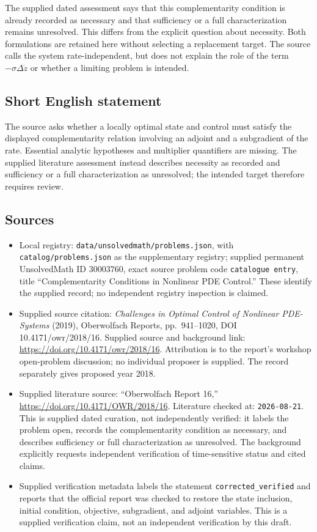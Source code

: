 \documentclass[11pt]{article}
\begin{document}
The supplied dated assessment says that this complementarity condition is already recorded as necessary and that sufficiency or a full characterization remains unresolved. This differs from the explicit question about necessity. Both formulations are retained here without selecting a replacement target. The source calls the system rate-independent, but does not explain the role of the term \(-\sigma\Delta\dot z\) or whether a limiting problem is intended.
\subsection{Short English statement}
The source asks whether a locally optimal state and control must satisfy the displayed complementarity relation involving an adjoint and a subgradient of the rate. Essential analytic hypotheses and multiplier quantifiers are missing. The supplied literature assessment instead describes necessity as recorded and sufficiency or a full characterization as unresolved; the intended target therefore requires review.
\subsection{Sources}
\begin{itemize}
\item Local registry: \texttt{data/unsolvedmath/problems.json}, with \texttt{catalog/problems.json} as the supplementary registry; supplied permanent UnsolvedMath ID \(30003760\), exact source problem code \texttt{catalogue entry}, title ``Complementarity Conditions in Nonlinear PDE Control.'' These identify the supplied record; no independent registry inspection is claimed.
\item Supplied source citation: \emph{Challenges in Optimal Control of Nonlinear PDE-Systems} (2019), Oberwolfach Reports, pp.\ 941--1020, DOI 10.4171/owr/2018/16. Supplied source and background link: \url{https://doi.org/10.4171/owr/2018/16}. Attribution is to the report's workshop open-problem discussion; no individual proposer is supplied. The record separately gives proposed year 2018.
\item Supplied literature source: ``Oberwolfach Report 16,'' \url{https://doi.org/10.4171/OWR/2018/16}. Literature checked at: \texttt{2026-08-21}. This is supplied dated curation, not independently verified: it labels the problem open, records the complementarity condition as necessary, and describes sufficiency or full characterization as unresolved. The background explicitly requests independent verification of time-sensitive status and cited claims.
\item Supplied verification metadata labels the statement \texttt{corrected\_verified} and reports that the official report was checked to restore the state inclusion, initial condition, objective, subgradient, and adjoint variables. This is a supplied verification claim, not an independent verification by this draft.
\end{itemize}
\end{document}
